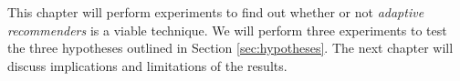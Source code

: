 \label{chap:results}

This chapter will perform experiments to find out whether or not
\emph{adaptive recommenders} is a viable technique.
We will perform three experiments to 
test the three hypotheses outlined in Section 
\ref{sec:hypotheses}.
The next chapter will discuss implications 
and limitations of the results.







%

